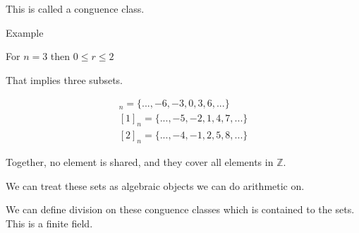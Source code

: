 \documentclass{report}
\begin{document}
\begin{description}
        This is called a conguence class.

    \item {\large Example}

        For $n = 3$ then $0 \le r \le 2$
    
        That implies three subsets.

        \begin{gather}
            [0]_n = \{ ..., -6, -3, 0, 3, 6, ...\}\\
            [1]_n = \{ ..., -5, -2, 1, 4, 7, ...\}\\
            [2]_n = \{ ..., -4, -1, 2, 5, 8, ...\}
        \end{gather}

        Together, no element is shared, and they cover all
        elements in $\mathbb{Z}$.

        We can treat these sets as algebraic objects we can
        do arithmetic on.

        We can define division on these conguence classes which
        is contained to the sets. This is a finite field.

\end{description}
\end{document}
